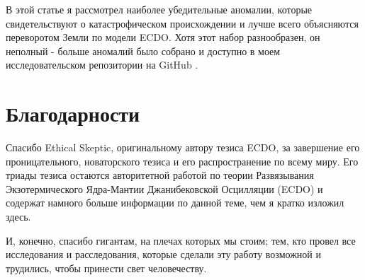 \documentclass[10pt,twocolumn,letterpaper]{article}
\begin{document}
В этой статье я рассмотрел наиболее убедительные аномалии, которые свидетельствуют о катастрофическом происхождении и лучше всего объясняются переворотом Земли по модели ECDO. Хотя этот набор разнообразен, он неполный - больше аномалий было собрано и доступно в моем исследовательском репозитории на GitHub \cite{2}.

\section{Благодарности}

Спасибо Ethical Skeptic, оригинальному автору тезиса ECDO, за завершение его проницательного, новаторского тезиса и его распространение по всему миру. Его триады тезиса \cite{1} остаются авторитетной работой по теории Развязывания Экзотермического Ядра-Мантии Джанибековской Осцилляции (ECDO) и содержат намного больше информации по данной теме, чем я кратко изложил здесь.

И, конечно, спасибо гигантам, на плечах которых мы стоим; тем, кто провел все исследования и расследования, которые сделали эту работу возможной и трудились, чтобы принести свет человечеству.

{\small


}
\end{document}
